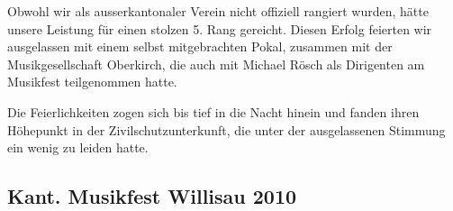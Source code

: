 \begin{history}
    Obwohl wir als ausserkantonaler Verein nicht offiziell rangiert wurden,
    hätte unsere Leistung für einen stolzen 5. Rang gereicht. Diesen Erfolg
    feierten wir ausgelassen mit einem selbst mitgebrachten Pokal, zusammen mit
    der Musikgesellschaft Oberkirch, die auch mit Michael Rösch als Dirigenten
    am Musikfest teilgenommen hatte.

    Die Feierlichkeiten zogen sich bis tief in die Nacht hinein und fanden ihren
    Höhepunkt in der Zivilschutzunterkunft, die unter der ausgelassenen Stimmung
    ein wenig zu leiden hatte.

\end{history}

\subsection*{Kant. Musikfest Willisau 2010}

